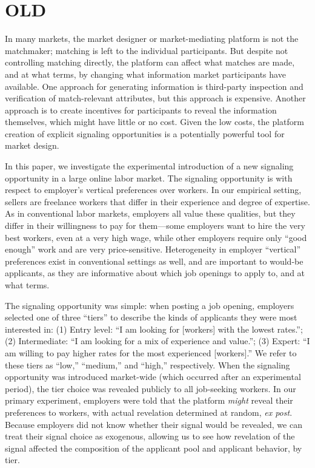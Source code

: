 \section{OLD}

In many markets, the market designer or market-mediating platform is not the matchmaker; matching is left to the individual participants.
But despite not controlling matching directly, the platform can affect what matches are made, and at what terms, by changing what information market participants have available.  
One approach for generating information is third-party inspection and verification of match-relevant attributes, but this approach is expensive.
Another approach is to create incentives for participants to reveal the information themselves, which might have little or no cost.
Given the low costs, the platform creation of explicit signaling opportunities is a potentially powerful tool for market design. 

In this paper, we investigate the experimental introduction of a new signaling opportunity in a large online labor market.
The signaling opportunity is with respect to employer's vertical preferences over workers. 
In our empirical setting, sellers are freelance workers that differ in their experience and degree of expertise.
As in conventional labor markets, employers all value these qualities, but they differ in their willingness to pay for them---some employers want to hire the very best workers, even at a very high wage, while other employers require only ``good enough'' work and are very price-sensitive.
Heterogeneity in employer ``vertical'' preferences exist in conventional settings as well, and are important to would-be applicants, as they are informative about which job openings to apply to, and at what terms.

The signaling opportunity was simple: when posting a job opening, employers selected one of three ``tiers'' to describe the kinds of applicants they were most interested in:
(1) Entry level: ``I am looking for [workers] with the lowest rates.'';
(2) Intermediate: ``I am looking for a mix of experience and value.'';
(3) Expert: ``I am willing to pay higher rates for the most experienced [workers].''
We refer to these tiers as ``low,'' ``medium,'' and ``high,'' respectively.
When the signaling opportunity was introduced market-wide (which occurred after an experimental period), the tier choice was revealed publicly to all job-seeking workers.
In our primary experiment, employers were told that the platform \emph{might} reveal their preferences to workers, with actual revelation determined at random, \emph{ex post}. 
Because employers did not know whether their signal would be revealed, we can treat their signal choice as exogenous, allowing us to see how revelation of the signal affected the composition of the applicant pool and applicant behavior, by tier.

